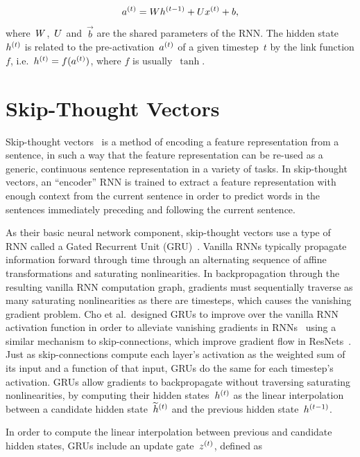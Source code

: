\begin{equation}
        a^{(t)} = Wh^{(t - 1)} + Ux^{(t)} + b,
\label{eqn:vanilla-rnn}
\end{equation}
where~$W$,~$U$ and~$\vec{b}$ are the shared parameters of the
RNN\@.
The hidden state~$h^{(t)}$ is related to the pre-activation~$a^{(t)}$
of a given timestep~$t$ by the link function $f$,
i.e.\ $h^{(t)} = f(a^{(t)})$, where $f$ is usually~$\tanh$.


\section{Skip-Thought Vectors}

Skip-thought vectors~\citep{kiros2015skip} is a method of encoding a feature
representation from a sentence, in such a way that the feature representation
can be re-used as a generic, continuous sentence representation in a variety of
tasks.
In skip-thought vectors, an ``encoder'' RNN is trained to extract a feature
representation with enough context from the current sentence in order to
predict words in the sentences immediately preceding and following the current
sentence.

As their basic neural network component, skip-thought vectors use a type of RNN
called a Gated Recurrent Unit (GRU)~\citep{cho2014ontheproperties}.
Vanilla RNNs typically propagate information forward through time through an
alternating sequence of affine transformations and saturating nonlinearities.
In backpropagation through the resulting vanilla RNN computation graph,
gradients must sequentially traverse as many saturating nonlinearities as there
are timesteps, which causes the vanishing gradient problem.
Cho et al.\ designed GRUs to improve over the vanilla RNN activation
function in order to alleviate vanishing gradients in
RNNs~\citep{cho2014ontheproperties} using a similar mechanism to
skip-connections, which improve gradient flow in ResNets~\citep{he2016deep}.
Just as skip-connections compute each layer's activation as the weighted sum of
its input and a function of that input, GRUs do the same for each timestep's
activation.
GRUs allow gradients to backpropagate without traversing saturating
nonlinearities, by computing their hidden states~$h^{(t)}$ as the linear
interpolation between a candidate hidden state~$\widetilde{h}^{(t)}$ and
the previous hidden state~$h^{(t - 1)}$.

In order to compute the linear interpolation between previous and candidate
hidden states, GRUs include an update gate~$z^{(t)}$, defined as

